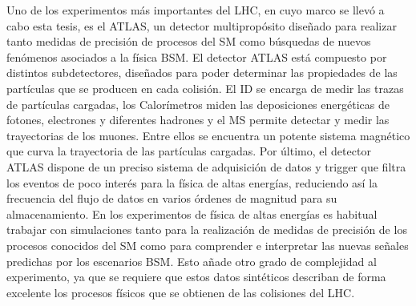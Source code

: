 Uno de los experimentos más importantes del \ac{LHC}, en cuyo marco se llevó a cabo esta tesis, es el \ac{ATLAS}, un detector multipropósito diseñado para realizar tanto medidas de precisión de procesos del \ac{SM} como búsquedas de nuevos fenómenos asociados a la física \ac{BSM}. El detector \ac{ATLAS} está compuesto por distintos subdetectores, diseñados para poder determinar las propiedades de las partículas que se producen en cada colisión. El \acl{ID} se encarga de medir las trazas de partículas cargadas, los Calorímetros miden las deposiciones energéticas de fotones, electrones y diferentes hadrones y el \acl{MS} permite detectar y medir las trayectorias de los muones. Entre ellos se encuentra un potente sistema magnético que curva la trayectoria de las partículas cargadas. Por último, el detector \ac{ATLAS} dispone de un preciso sistema de adquisición de datos y  trigger que filtra los eventos de poco interés para la física de altas energías, reduciendo así la frecuencia del flujo de datos en varios órdenes de magnitud para su almacenamiento. En los experimentos de física de altas energías es habitual trabajar con simulaciones tanto para la realización de medidas de precisión de los procesos conocidos del \ac{SM} como para comprender e interpretar las nuevas señales predichas por los escenarios \ac{BSM}. Esto añade otro grado de complejidad al experimento, ya que se requiere que estos datos sintéticos describan de forma excelente los procesos físicos que se obtienen de las colisiones del \ac{LHC}. 

